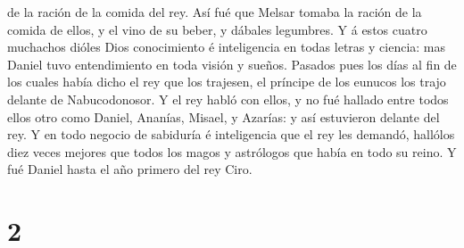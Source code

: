 de la ración de la comida del rey.  Así fué que Melsar
tomaba la ración de la comida de ellos, y el vino de su beber, y dábales
legumbres.  Y á estos cuatro muchachos dióles Dios
conocimiento é inteligencia en todas letras y ciencia: mas Daniel tuvo
entendimiento en toda visión y sueños.  Pasados pues los
días al fin de los cuales había dicho el rey que los trajesen, el
príncipe de los eunucos los trajo delante de Nabucodonosor.
 Y el rey habló con ellos, y no fué hallado entre todos
ellos otro como Daniel, Ananías, Misael, y Azarías: y así estuvieron
delante del rey.  Y en todo negocio de sabiduría é
inteligencia que el rey les demandó, hallólos diez veces mejores que
todos los magos y astrólogos que había en todo su reino.  Y
fué Daniel hasta el año primero del rey Ciro.

\hypertarget{section-1}{%
\section{2}\label{section-1}}


